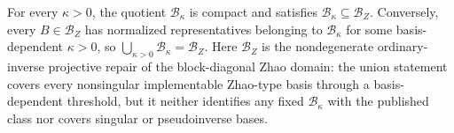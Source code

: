 For every \(\kappa>0\), the quotient \(\mathcal B_\kappa\) is compact and satisfies \(\mathcal B_\kappa\subseteq\mathcal B_Z\).  Conversely, every \(B\in\mathcal B_Z\) has normalized representatives belonging to \(\mathcal B_\kappa\) for some basis-dependent \(\kappa>0\), so \(\bigcup_{\kappa>0}\mathcal B_\kappa=\mathcal B_Z\).  Here \(\mathcal B_Z\) is the nondegenerate ordinary-inverse projective repair of the block-diagonal Zhao domain: the union statement covers every nonsingular implementable Zhao-type basis through a basis-dependent threshold, but it neither identifies any fixed \(\mathcal B_\kappa\) with the published class nor covers singular or pseudoinverse bases.